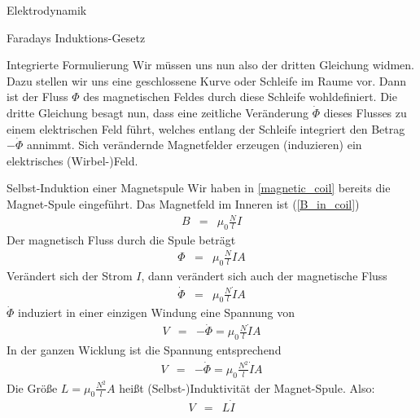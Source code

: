 \begin{chapter}{\titlestr}
\begin{section}{Elektrodynamik}
\begin{subsection}{Faradays Induktions-Gesetz}
\begin{subsubsection}{Integrierte Formulierung}
Wir müssen uns nun also der dritten Gleichung widmen. Dazu stellen wir uns eine geschlossene Kurve oder Schleife im Raume vor. Dann ist der Fluss $\Phi$ des magnetischen Feldes durch diese Schleife wohldefiniert.
Die dritte Gleichung besagt nun, dass eine zeitliche Veränderung $\dot{\Phi}$ dieses Flusses zu einem elektrischen Feld führt, welches entlang der Schleife integriert den Betrag $-\dot{\Phi}$ annimmt.
Sich verändernde Magnetfelder erzeugen (induzieren) ein elektrisches (Wirbel-)Feld.
\end{subsubsection}

\begin{subsubsection}{Selbst-Induktion einer Magnetspule}
Wir haben in \ref{magnetic_coil} bereits die Magnet-Spule eingeführt. Das Magnetfeld im Inneren ist (\ref{B_in_coil})
\begin{eqnarray*}
B &=& \mu_0\frac{N}{l}I
\end{eqnarray*}
Der magnetisch Fluss durch die Spule beträgt
\begin{eqnarray*}
\Phi &=& \mu_0\frac{N}{l}IA
\end{eqnarray*}
Verändert sich der Strom $I$, dann verändert sich auch der magnetische Fluss
\begin{eqnarray*}
\dot{\Phi} &=& \mu_0\frac{N}{l}\dot{I}A
\end{eqnarray*}
$\dot{\Phi}$ induziert in einer einzigen Windung eine Spannung von
\begin{eqnarray*}
V &=& -\dot{\Phi} = \mu_0\frac{N}{l}\dot{I}A
\end{eqnarray*}
In der ganzen Wicklung ist die Spannung entsprechend
\begin{eqnarray*}
V &=& -\dot{\Phi} = \mu_0\frac{N^2}{l}\dot{I}A
\end{eqnarray*}
Die Größe $L=\mu_0\frac{N^2}{l}A$ heißt (Selbst-)Induktivität der Magnet-Spule. Also:
\begin{eqnarray*}
V &=& L\dot{I}
\end{eqnarray*}
\end{subsubsection}


\end{subsection}
\end{section}
\end{chapter}
